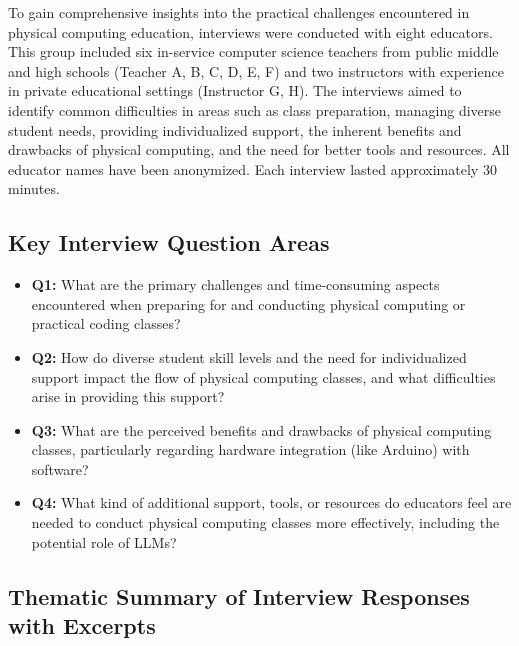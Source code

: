 \documentclass{article} %
\begin{document}


To gain comprehensive insights into the practical challenges encountered in physical computing education, interviews were conducted with eight educators.
This group included six in-service computer science teachers from public middle and high schools (Teacher A, B, C, D, E, F) and two instructors with experience in private educational settings (Instructor G, H).
The interviews aimed to identify common difficulties in areas such as class preparation, managing diverse student needs, providing individualized support, the inherent benefits and drawbacks of physical computing, and the need for better tools and resources.
All educator names have been anonymized.
Each interview lasted approximately 30 minutes.


\subsection{Key Interview Question Areas}
\begin{itemize}[itemsep=0em, topsep=0.5em, labelsep=0.5em, leftmargin=0.5em]
    \item \textbf{Q1:} What are the primary challenges and time-consuming aspects encountered when preparing for and conducting physical computing or practical coding classes?
    \item \textbf{Q2:} How do diverse student skill levels and the need for individualized support impact the flow of physical computing classes, and what difficulties arise in providing this support?
    \item \textbf{Q3:} What are the perceived benefits and drawbacks of physical computing classes, particularly regarding hardware integration (like Arduino) with software?
    \item \textbf{Q4:} What kind of additional support, tools, or resources do educators feel are needed to conduct physical computing classes more effectively, including the potential role of LLMs?
\end{itemize}

\subsection{Thematic Summary of Interview Responses with Excerpts}
\label{Appendix:Interview.Details}
\vspace{1em}
\end{document}

